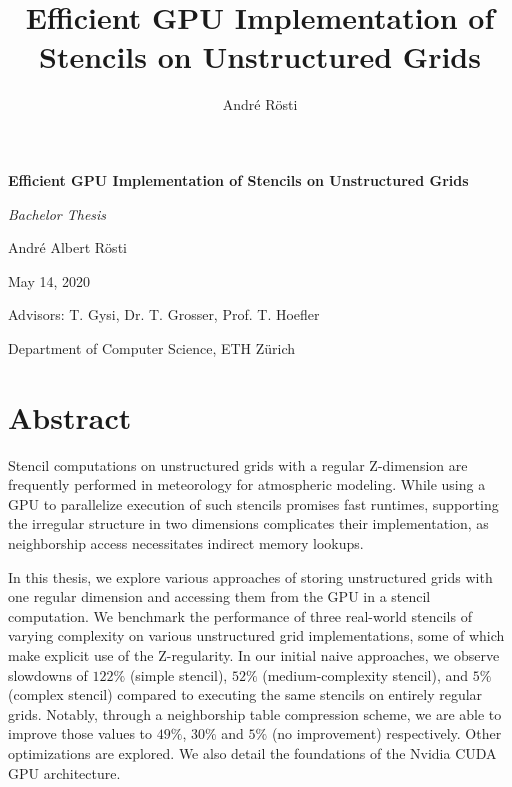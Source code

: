 \documentclass[a4paper, 11pt]{book}
\title{Efficient GPU Implementation of Stencils on Unstructured Grids}
\author{André Rösti}
\begin{document}
\begin{titlepage}
	\begin{center}
		\vspace*{2cm}
		{\Huge \textbf{Efficient GPU Implementation of Stencils on Unstructured Grids}}
		\vspace{2cm}
		
		{\Large \textit{Bachelor Thesis}}
		\vspace{2cm}
		
		André Albert Rösti
		
		May 14, 2020
	\end{center}
	\vfill
	\raggedleft Advisors: T. Gysi, Dr. T. Grosser, Prof. T. Hoefler
		
	\raggedleft Department of Computer Science, ETH Zürich
	\vspace*{2cm}
\end{titlepage}
\restoregeometry

\thispagestyle{empty}

\tableofcontents

\chapter*{Abstract}

Stencil computations on unstructured grids with a regular Z-dimension are frequently performed in meteorology for atmospheric modeling. While using a GPU to parallelize execution of such stencils promises fast runtimes, supporting the irregular structure in two dimensions complicates their implementation, as neighborship access necessitates indirect memory lookups.

In this thesis, we explore various approaches of storing unstructured grids with one regular dimension and accessing them from the GPU in a stencil computation. We benchmark the performance of three real-world stencils of varying complexity on various unstructured grid implementations, some of which make explicit use of the Z-regularity. In our initial naive approaches, we observe slowdowns of $122\%$ (simple stencil), $52\%$ (medium-complexity stencil), and $5\%$ (complex stencil) compared to executing the same stencils on entirely regular grids. Notably, through a neighborship table compression scheme, we are able to improve those values to $49\%$, $30\%$ and $5\%$ (no improvement) respectively. Other optimizations are explored. We also detail the foundations of the Nvidia CUDA GPU architecture.













%

\printbibliography
\end{document}
